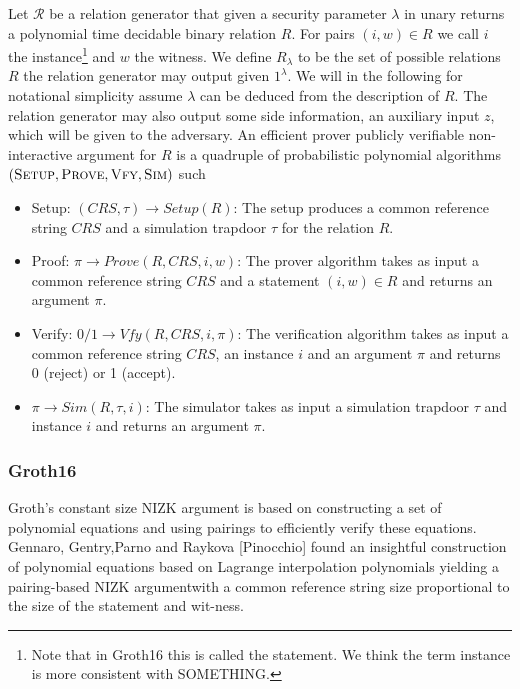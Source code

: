 \begin{definition} 
Let $\mathcal{R}$ be a relation generator that given a security parameter $\lambda$ in unary returns a polynomial time decidable binary relation $R$. For pairs $(i,w)\in R$ we call $i$ the instance\footnote{Note that in Groth16 this is called the statement. We think the term instance is more consistent with SOMETHING. } and $w$ the witness. We define $R_\lambda$ to be the set of possible relations $R$ the relation generator may output given $1^\lambda$. We will in the following for notational simplicity assume $\lambda$ can be deduced from the description of $R$. The relation generator may also output some side information, an auxiliary input $z$, which will be given to the adversary. An efficient prover publicly verifiable non-interactive argument for $R$ is a quadruple of probabilistic polynomial algorithms $(\textsc{Setup},\textsc{Prove},\textsc{Vfy},\textsc{Sim})$ such 
\begin{itemize}
\item Setup: $(CRS,\tau)\rightarrow Setup(R)$: The setup produces a common reference string $CRS$ and a simulation trapdoor $\tau$ for the relation $R$.
\item Proof: $\pi\rightarrow Prove(R,CRS,i,w)$: The prover algorithm takes as input a common reference string $CRS$ and a statement $(i,w)\in R$ and returns an argument $\pi$.
\item Verify: $0/1\rightarrow Vfy(R,CRS,i,\pi)$: The  verification algorithm  takes as input a common reference string $CRS$, an instance $i$ and an argument $\pi$ and returns 0 (reject) or 1 (accept).
\item $\pi\rightarrow Sim(R,\tau,i)$: The simulator takes as input a simulation trapdoor $\tau$ and instance $i$ and returns an argument $\pi$. 
\end{itemize}
\end{definition}

\subsubsection{Groth16}
Groth’s  constant  size  NIZK  argument  is  based  on  constructing  a  set  of  polynomial equations and using pairings to efficiently verify these equations. Gennaro, Gentry,Parno and Raykova [Pinocchio] found an insightful construction of polynomial equations based on Lagrange interpolation polynomials yielding a pairing-based NIZK argumentwith a common reference string size proportional to the size of the statement and wit-ness.

